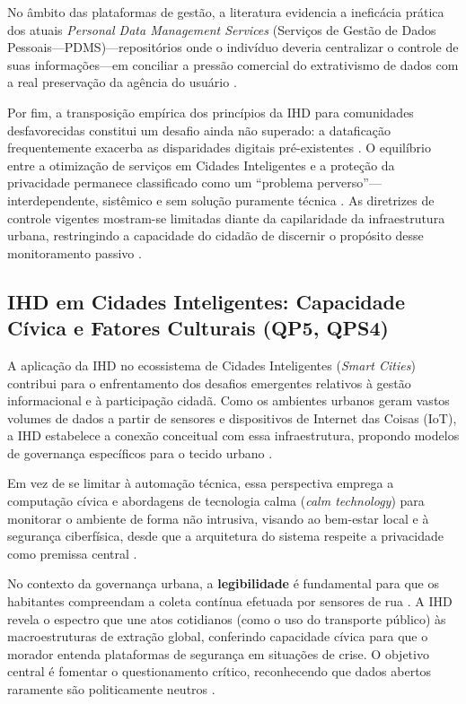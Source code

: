 \documentclass[12pt]{article}
\begin{document}
    No âmbito das plataformas de gestão, a literatura evidencia a ineficácia prática dos atuais \textit{Personal Data Management Services} (Serviços de Gestão de Dados Pessoais---PDMS)---repositórios onde o indivíduo deveria centralizar o controle de suas informações---em conciliar a pressão comercial do extrativismo de dados com a real preservação da agência do usuário \cite{angelopoulos2021stewardship}.

    Por fim, a transposição empírica dos princípios da IHD para comunidades desfavorecidas constitui um desafio ainda não superado: a dataficação frequentemente exacerba as disparidades digitais pré-existentes \cite{hayes2024making, Locoro2020}. O equilíbrio entre a otimização de serviços em Cidades Inteligentes e a proteção da privacidade permanece classificado como um ``problema perverso''---interdependente, sistêmico e sem solução puramente técnica \cite{Meireles2016, Chowdhury2016}. As diretrizes de controle vigentes mostram-se limitadas diante da capilaridade da infraestrutura urbana, restringindo a capacidade do cidadão de discernir o propósito desse monitoramento passivo \cite{Mashhadi2014}.


    \subsection{IHD em Cidades Inteligentes: Capacidade Cívica e Fatores Culturais (QP5, QPS4)}

    A aplicação da IHD no ecossistema de Cidades Inteligentes (\textit{Smart Cities}) contribui para o enfrentamento dos desafios emergentes relativos à gestão informacional e à participação cidadã. Como os ambientes urbanos geram vastos volumes de dados a partir de sensores e dispositivos de Internet das Coisas (IoT), a IHD estabelece a conexão conceitual com essa infraestrutura, propondo modelos de governança específicos para o tecido urbano \cite{Mashhadi2014, Chowdhury2016, barcellos2022towards}.

    Em vez de se limitar à automação técnica, essa perspectiva emprega a computação cívica e abordagens de tecnologia calma (\textit{calm technology}) para monitorar o ambiente de forma não intrusiva, visando ao bem-estar local e à segurança ciberfísica, desde que a arquitetura do sistema respeite a privacidade como premissa central \cite{Konomi2022, Chowdhury2016}.

    No contexto da governança urbana, a \textbf{legibilidade} é fundamental para que os habitantes compreendam a coleta contínua efetuada por sensores de rua \cite{Coleti2019DesigPatterns, Hutton2017}. A IHD revela o espectro que une atos cotidianos (como o uso do transporte público) às macroestruturas de extração global, conferindo capacidade cívica para que o morador entenda plataformas de segurança em situações de crise. O objetivo central é fomentar o questionamento crítico, reconhecendo que dados abertos raramente são politicamente neutros \cite{Parviainen2016, barcellos2022towards}.
\end{document}

